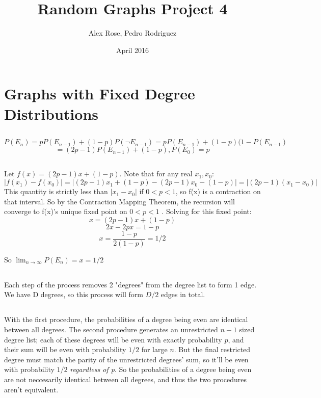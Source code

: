 \documentclass{article}
\title{Random Graphs Project 4}
\author{Alex Rose, Pedro Rodriguez}
\date{April 2016}
\begin{document}
\maketitle

\section{ Graphs with Fixed Degree Distributions}

\subsection{ }

$$P(E_n) = pP(E_{n-1}) + (1-p)P(\neg E_{n-1}) = pP(E_{n-1}) + (1-p)(1- P(E_{n-1}) $$
$$ = (2p-1)P(E_{n-1}) + (1 - p), P(E_0) = p$$

\subsection{} 
Let $f(x) = (2p -1)x + (1-p)$. Note that for any real $x_1,x_0$:
$$|f(x_1) - f(x_0)| = |(2p-1)x_1 + (1-p) - (2p-1)x_0 - (1-p)| = |(2p-1)(x_1-x_0)|$$
This quantity is strictly less than $|x_1-x_0|$ if $0 < p < 1$, so f(x) is a contraction on that interval. So by the Contraction Mapping Theorem, the recursion will converge to f(x)'s unique fixed point on $0 < p < 1$ .  Solving for this fixed point:
$$x = (2p-1)x + (1-p)$$
$$2x - 2px = 1-p$$
$$x = \frac{1-p}{2(1-p)} = 1/2$$

So $\lim_{n\to\infty} P(E_{n})= x = 1/2$

\subsection{}
Each step of the process removes 2 "degrees" from the degree list to form 1 edge. We have D degrees, so this process will form $D/2$ edges in total.

\subsection{}
With the first procedure, the probabilities of a degree being even are identical between all degrees. The second procedure generates an unrestricted $n-1$ sized degree list; each of these degrees will be even with exactly probability $p$, and their sum will be even with probability $1/2$ for large $n$. But the final restricted degree must match the parity of the unrestricted degrees' sum, so it'll be even with probability $1/2$ \textit{regardless of p}. So the probabilities of a degree being even are not neccesarily identical between all degrees, and thus the two procedures aren't equivalent. 
\end{document}
